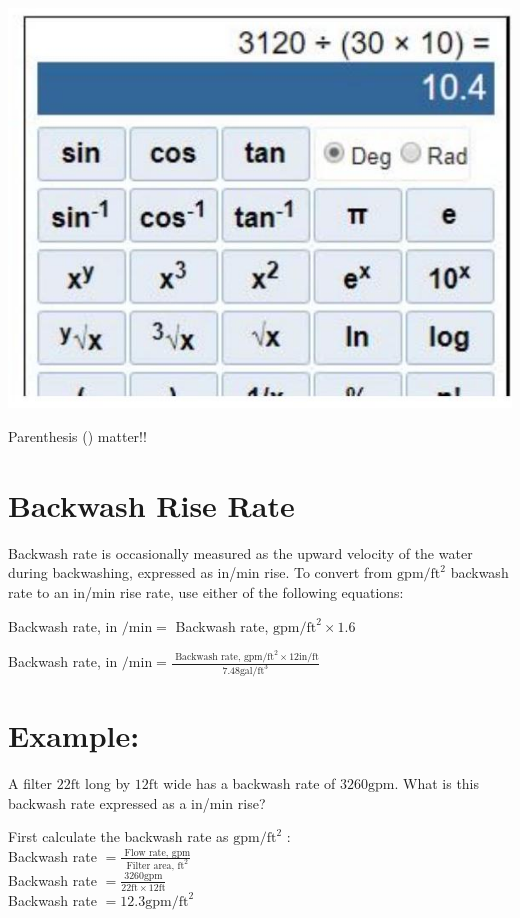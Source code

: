 \documentclass[10pt]{article}
\begin{document}
\includegraphics[max width=\textwidth]{2022_10_14_fef65bffdeb472549abeg-07}

Parenthesis () matter!!

\section{Backwash Rise Rate}
Backwash rate is occasionally measured as the upward velocity of the water during backwashing, expressed as in/min rise. To convert from $\mathrm{gpm} / \mathrm{ft}^{2}$ backwash rate to an in/min rise rate, use either of the following equations:

Backwash rate, in $/ \mathrm{min}=$ Backwash rate, $\mathrm{gpm} / \mathrm{ft}^{2} \times 1.6$

Backwash rate, in $/ \mathrm{min}=\frac{\text { Backwash rate, } \mathrm{gpm} / \mathrm{ft}^{2} \times 12 \mathrm{in} / \mathrm{ft}}{7.48 \mathrm{gal} / \mathrm{ft}^{3}}$

\section{Example:}
A filter $22 \mathrm{ft}$ long by $12 \mathrm{ft}$ wide has a backwash rate of $3260 \mathrm{gpm}$. What is this backwash rate expressed as a in/min rise?

First calculate the backwash rate as $\mathrm{gpm} / \mathrm{ft}^{2}$ :\\
Backwash rate $=\frac{\text { Flow rate, } \mathrm{gpm}}{\text { Filter area, } \mathrm{ft}^{2}}$\\
Backwash rate $=\frac{3260 \mathrm{gpm}}{22 \mathrm{ft} \times 12 \mathrm{ft}}$\\
Backwash rate $=12.3 \mathrm{gpm} / \mathrm{ft}^{2}$
\end{document}
